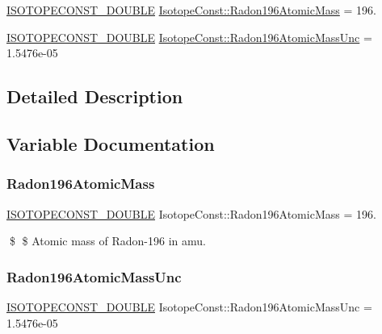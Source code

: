 \begin{DoxyCompactItemize}
\item 
\mbox{\hyperlink{group___isotope_const-_macros_ga8f45a7272ce02c0b4c65c44636ed719a}{I\+S\+O\+T\+O\+P\+E\+C\+O\+N\+S\+T\+\_\+\+D\+O\+U\+B\+LE}} \mbox{\hyperlink{group___isotope_const-_radon-_rn196_ga540b76837a3524c6358b54669dcb34b2}{Isotope\+Const\+::\+Radon196\+Atomic\+Mass}} = 196.
\item 
\mbox{\hyperlink{group___isotope_const-_macros_ga8f45a7272ce02c0b4c65c44636ed719a}{I\+S\+O\+T\+O\+P\+E\+C\+O\+N\+S\+T\+\_\+\+D\+O\+U\+B\+LE}} \mbox{\hyperlink{group___isotope_const-_radon-_rn196_gaf59d42803a3dae00daff6d9bd50c0107}{Isotope\+Const\+::\+Radon196\+Atomic\+Mass\+Unc}} = 1.\+5476e-\/05
\end{DoxyCompactItemize}


\subsection{Detailed Description}


\subsection{Variable Documentation}
\mbox{\label{group___isotope_const-_radon-_rn196_ga540b76837a3524c6358b54669dcb34b2}} 
\subsubsection{\texorpdfstring{Radon196\+Atomic\+Mass}{Radon196AtomicMass}}
{\footnotesize\ttfamily \mbox{\hyperlink{group___isotope_const-_macros_ga8f45a7272ce02c0b4c65c44636ed719a}{I\+S\+O\+T\+O\+P\+E\+C\+O\+N\+S\+T\+\_\+\+D\+O\+U\+B\+LE}} Isotope\+Const\+::\+Radon196\+Atomic\+Mass = 196.}

\$ \$ Atomic mass of Radon-\/196 in amu. \mbox{\label{group___isotope_const-_radon-_rn196_gaf59d42803a3dae00daff6d9bd50c0107}} 
\subsubsection{\texorpdfstring{Radon196\+Atomic\+Mass\+Unc}{Radon196AtomicMassUnc}}
{\footnotesize\ttfamily \mbox{\hyperlink{group___isotope_const-_macros_ga8f45a7272ce02c0b4c65c44636ed719a}{I\+S\+O\+T\+O\+P\+E\+C\+O\+N\+S\+T\+\_\+\+D\+O\+U\+B\+LE}} Isotope\+Const\+::\+Radon196\+Atomic\+Mass\+Unc = 1.\+5476e-\/05}

